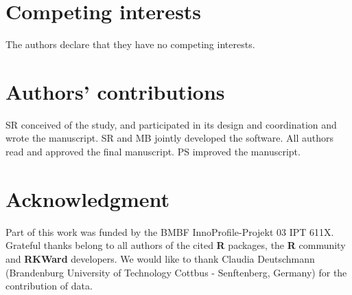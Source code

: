 \documentclass[twocolumn]{bmcart}%
\begin{document}

\begin{backmatter}

\section*{Competing interests}
The authors declare that they have no competing interests.

\section*{Authors' contributions}
SR conceived of the study, and participated in its design and coordination and 
wrote the manuscript. SR and MB jointly developed the software. All authors read 
and approved the final manuscript. PS improved the manuscript.

\section*{Acknowledgment}
Part of this work was funded by the BMBF InnoProfile-Projekt 03 IPT 611X. 
Grateful thanks belong to all authors of the cited \textbf{R} packages, the 
\textbf{R} community and \textbf{RKWard} developers. We would like to thank 
Claudia Deutschmann (Brandenburg University of Technology Cottbus - Senftenberg, 
Germany) for the contribution of data.



\end{backmatter}
\end{document}
